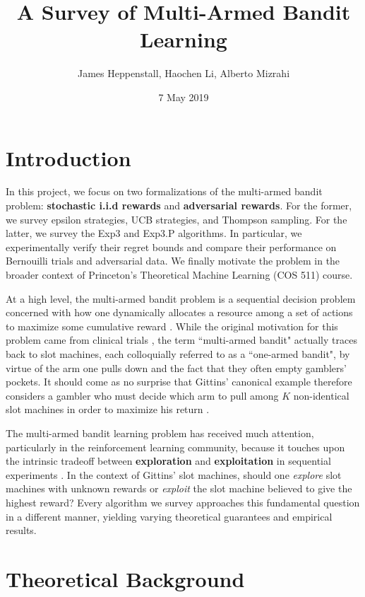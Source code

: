 \documentclass[12pt]{article}
\title{A Survey of Multi-Armed Bandit Learning}
\author{James Heppenstall, Haochen Li, Alberto Mizrahi}
\date{7 May 2019}
\begin{document}
\maketitle

\section{Introduction}

In this project, we focus on two formalizations of the multi-armed bandit problem: \textbf{stochastic i.i.d rewards} and \textbf{adversarial rewards}. For the former, we survey epsilon strategies, UCB strategies, and Thompson sampling. For the latter, we survey the Exp3 and Exp3.P algorithms. In particular, we experimentally verify their regret bounds and compare their performance on Bernouilli trials and adversarial data. We finally motivate the problem in the broader context of Princeton's Theoretical Machine Learning (COS 511) course.

At a high level, the multi-armed bandit problem is a sequential decision problem concerned with how one dynamically allocates a resource among a set of actions to maximize some cumulative reward \cite{robbins1952}. While the original motivation for this problem came from clinical trials \cite{thompson1933}, the term ``multi-armed bandit" actually traces back to slot machines, each colloquially referred to as a ``one-armed bandit", by virtue of the arm one pulls down and the fact that they often empty gamblers' pockets. It should come as no surprise that Gittins' canonical example therefore considers a gambler who must decide which arm to pull among $K$ non-identical slot machines in order to maximize his return \cite{gittins1979}.

The multi-armed bandit learning problem has received much attention, particularly in the reinforcement learning community, because it touches upon the intrinsic tradeoff between \textbf{exploration} and \textbf{exploitation} in sequential experiments \cite{bubeck2012}. In the context of Gittins' slot machines, should one \textit{explore} slot machines with unknown rewards or \textit{exploit} the slot machine believed to give the highest reward? Every algorithm we survey approaches this fundamental question in a different manner, yielding varying theoretical guarantees and empirical results.

\section{Theoretical Background}
\end{document}
